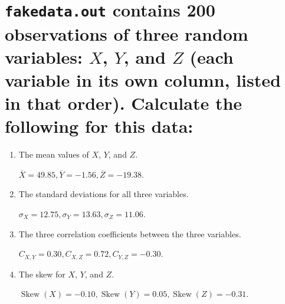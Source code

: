 
    \section{\texttt{fakedata.out} contains 200 observations
    of three random variables: \texorpdfstring{$X$}{X},
    \texorpdfstring{$Y$}{Y}, and \texorpdfstring{$Z$}{Z}
    (each variable in its own column, listed in that order).
    Calculate the following for this data:}

    \begin{enumerate}[label=\textbf{\Alph*}.]
        \item The mean values of $X$, $Y$, and $Z$.

        $\overline{X} = 49.85, \overline{Y} = -1.56, \overline{Z} = -19.38$.

        \item The standard deviations for all three variables.

        $\sigma_{X} = 12.75, \sigma_{Y} = 13.63, \sigma_{Z} = 11.06$.

        \item The three correlation coefficients between the three variables.

        $C_{X,Y} = 0.30, C_{X,Z} = 0.72, C_{Y,Z} = -0.30$.

        \item The skew for $X$, $Y$, and $Z$.
        
        $\operatorname{Skew}(X) = -0.10, \operatorname{Skew}(Y) = 0.05, \operatorname{Skew}(Z) = -0.31$.
    \end{enumerate}
    